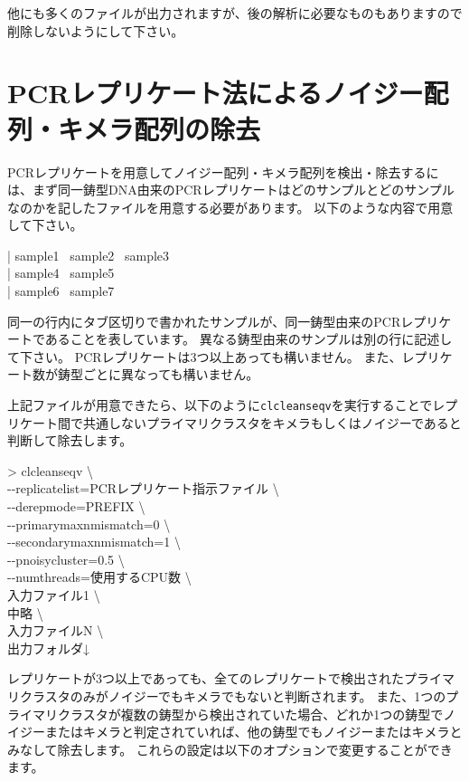\documentclass[titlepage,10pt,a4paper]{jsbook}
\newenvironment{content}{\begin{shaded}\vspace{-1em}\raggedright\ttfamily\footnotesize\setlength{\baselineskip}{1.4em}}{\end{shaded}\vspace{-1em}}
\newenvironment{cmd}{\begin{oframed}\raggedright\ttfamily\footnotesize\setlength{\baselineskip}{1.4em}}{\end{oframed}\vspace{-1em}}
\begin{document}
他にも多くのファイルが出力されますが、後の解析に必要なものもありますので削除しないようにして下さい。

\section{PCRレプリケート法によるノイジー配列・キメラ配列の除去}

PCRレプリケートを用意してノイジー配列・キメラ配列を検出・除去するには、まず同一鋳型DNA由来のPCRレプリケートはどのサンプルとどのサンプルなのかを記したファイルを用意する必要があります。
以下のような内容で用意して下さい。

\begin{content}
| sample1~ sample2~ sample3\\
| sample4~ sample5\\
| sample6~ sample7
\end{content}

同一の行内にタブ区切りで書かれたサンプルが、同一鋳型由来のPCRレプリケートであることを表しています。
異なる鋳型由来のサンプルは別の行に記述して下さい。
PCRレプリケートは3つ以上あっても構いません。
また、レプリケート数が鋳型ごとに異なっても構いません。

上記ファイルが用意できたら、以下のように\texttt{clcleanseqv}を実行することでレプリケート間で共通しないプライマリクラスタをキメラもしくはノイジーであると判断して除去します。

\begin{cmd}
{\textgreater} clcleanseqv {\textbackslash}\\
{-}{-}replicatelist=PCRレプリケート指示ファイル {\textbackslash}\\
{-}{-}derepmode=PREFIX {\textbackslash}\\
{-}{-}primarymaxnmismatch=0 {\textbackslash}\\
{-}{-}secondarymaxnmismatch=1 {\textbackslash}\\
{-}{-}pnoisycluster=0.5 {\textbackslash}\\
{-}{-}numthreads=使用するCPU数 {\textbackslash}\\
入力ファイル1 {\textbackslash}\\
中略 {\textbackslash}\\
入力ファイルN {\textbackslash}\\
出力フォルダ↓
\end{cmd}

レプリケートが3つ以上であっても、全てのレプリケートで検出されたプライマリクラスタのみがノイジーでもキメラでもないと判断されます。
また、1つのプライマリクラスタが複数の鋳型から検出されていた場合、どれか1つの鋳型でノイジーまたはキメラと判定されていれば、他の鋳型でもノイジーまたはキメラとみなして除去します。
これらの設定は以下のオプションで変更することができます。
\end{document}
